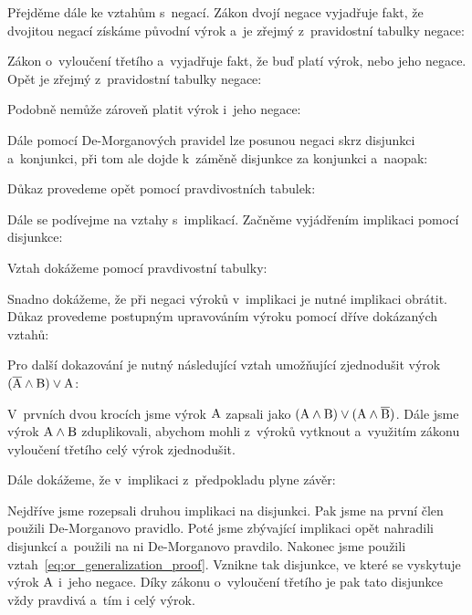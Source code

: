 
Přejděme dále ke vztahům s~negací. Zákon dvojí negace vyjadřuje fakt, že dvojitou negací získáme původní výrok a~je zřejmý z~pravidostní tabulky negace:


Zákon o~vyloučení třetího a~vyjadřuje fakt, že buď platí výrok, nebo jeho negace. Opět je zřejmý z~pravidostní tabulky negace:


Podobně nemůže zároveň platit výrok i~jeho negace: 


Dále pomocí De-Morganových pravidel lze posunou negaci skrz disjunkci a~konjunkci, při tom ale dojde k~záměně disjunkce za konjunkci a~naopak:


Důkaz provedeme opět pomocí pravdivostních tabulek:



Dále se podívejme na vztahy s~implikací. Začněme vyjádřením implikaci pomocí disjunkce:


Vztah dokážeme pomocí pravdivostní tabulky:


Snadno dokážeme, že při negaci výroků v~implikaci je nutné implikaci obrátit. Důkaz provedeme postupným upravováním výroku pomocí dříve dokázaných vztahů:


Pro další dokazování je nutný následující vztah umožňující zjednodušit výrok \((\overline{\mathrm{A}} \land \mathrm{B}) \lor \mathrm{A}\):


V~prvních dvou krocích jsme výrok \(\mathrm{A}\) zapsali jako \((\mathrm{A} \land \mathrm{B}) \lor (\mathrm{A} \land \overline{\mathrm{B}})\). Dále jsme výrok \(\mathrm{A} \land \mathrm{B}\) zduplikovali, abychom mohli z~výroků vytknout a~využitím zákonu vyloučení třetího celý výrok zjednodušit.

Dále dokážeme, že v~implikaci z~předpokladu plyne závěr:


Nejdříve jsme rozepsali druhou implikaci na disjunkci. Pak jsme na první člen použili De-Morganovo pravidlo. Poté jsme zbývající implikaci opět nahradili disjunkcí a~použili na ni De-Morganovo pravdilo. Nakonec jsme použili vztah~\eqref{eq:or_generalization_proof}. Vznikne tak disjunkce, ve které se vyskytuje výrok 
\(\mathrm{A}\) i~jeho negace. Díky zákonu o~vyloučení třetího je pak tato disjunkce vždy pravdivá a~tím i celý výrok.

